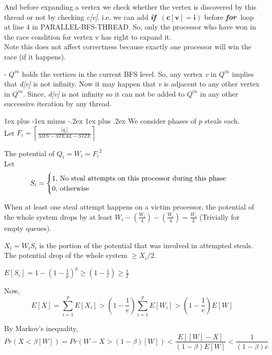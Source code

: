 \documentclass[11pt]{article}
\makeatletter
\renewcommand{\subsection}{\@startsection{subsection}{2}{0mm}%
                                     {1ex plus -1ex minus -.2ex}%
                                     {1ex plus .2ex}%
                                     {\normalfont\large\bfseries}}%
\newcommand{\ceil}[1]{\ensuremath{\left\lceil#1\right\rceil}}
\newcommand{\xif}{{\bf{\em{if~}}}}
\newcommand{\xfor}{{\bf{\em{for~}}}}
\makeatother
\begin{document}
And before expanding a vertex we check whether the vertex is discovered by this thread or not by checking {\it c[v]}. i.e. we can add \xif $\mathbf{(c[v] = i)}$ before \xfor loop at line 4 in PARALLEL-BFS-THREAD. So, only the processor who have won in the race condition for vertex v has right to expand it.\\  Note this does not affect correctness because exactly one processor will win the race (if it happens).

- $Q^{in}$ holds the vertices in the current BFS level. So, any vertex {\it v} in $Q^{in}$ implies that {\it d[v]} is not infinity. Now it may happen that {\it v} is adjacent to any other vertex in $Q^{in}$. Since, {\it d[v]} is not infinity so it can not be added to $Q^{in}$ in any other successive iteration by any thread.      

\subsection{}
We consider phases of $p$ steals each.\\
Let $F_i = \ceil {\frac {|q_i|}{MIN-STEAL-SIZE}}$

The potential of $Q_i = W_i = {F_i}^2$\\
Let \[
S_i = \begin{cases}
1 , $ No steal attempts on this processor during this phase$\\
0 , $  otherwise$
\end{cases}
\]

When at least one steal attempt happens on a victim processor, the potential of the whole system drops by at least
$W_i - (\frac{W_i}{4}) - (\frac{W_i}{4}) = \frac{W_i}{2}$ (Trivially for empty queues).

$X_i = W_i S_i$ is the portion of the potential that was involved in attempted steals.
The potential drop of the whole system $\ge X_i/2$.


$E[S_i] = 1 - {(1-\frac{1}{p})}^p \geq (1-\frac{1}{e}) \geq \frac{1}{2}$

Now, \[
E \left[ X \right] = \sum \limits_{i=1}^p E \left[ X_i \right] > \left( 1 - \frac{1}{e} \right) \sum \limits_{i=1}^p E[W_i] >\left( 1 - \frac{1}{e} \right) E \left [W \right ]
\]

By Markov's inequality,\\
\[Pr \left( X < \beta [W] \right) = Pr \left( W - X > (1 - \beta)[W] \right) < \frac {E \left[ [W] - X \right]}{\left(1 - \beta \right)  E[W]} < \frac {1}{\left(1 - \beta \right) e }
\] \\\\\\\\
\end{document}
